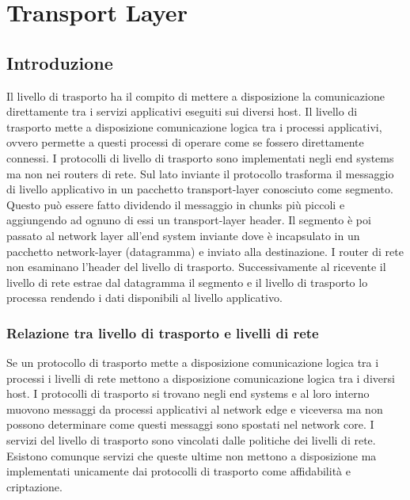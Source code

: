 \chapter{Transport Layer}
\section{Introduzione}
Il livello di trasporto ha il compito di mettere a disposizione la comunicazione direttamente tra i servizi applicativi eseguiti sui diversi host. Il 
livello di trasporto mette a disposizione comunicazione logica tra i processi applicativi, ovvero permette a questi processi di operare come se fossero 
direttamente connessi. I protocolli di livello di trasporto sono implementati negli end systems ma non nei routers di rete. Sul lato inviante il protocollo
trasforma il messaggio di livello applicativo in un pacchetto transport-layer conosciuto come segmento. Questo pu\`o essere fatto dividendo il messaggio in 
chunks pi\`u piccoli e aggiungendo ad ognuno di essi un transport-layer header. Il segmento \`e poi passato al network layer all'end system inviante dove
\`e incapsulato in un pacchetto network-layer (datagramma) e inviato alla destinazione. I router di rete non esaminano l'header del livello di trasporto.
Successivamente al ricevente il livello di rete estrae dal datagramma il segmento e il livello di trasporto lo processa rendendo i dati disponibili al
livello applicativo. 
\subsection{Relazione tra livello di trasporto e livelli di rete}
Se un protocollo di trasporto mette a disposizione comunicazione logica tra i processi i livelli di rete mettono a disposizione comunicazione logica tra i
diversi host. I protocolli di trasporto si trovano negli end systems e al loro interno muovono messaggi da processi applicativi al network edge e viceversa
ma non possono determinare come questi messaggi sono spostati nel network core. I servizi del livello di trasporto sono vincolati dalle politiche dei 
livelli di rete. Esistono comunque servizi che queste ultime non mettono a disposizione ma implementati unicamente dai protocolli di trasporto come 
affidabilit\`a e criptazione. 

